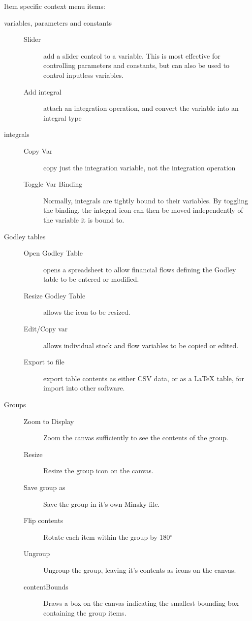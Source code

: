 Item specific context menu items:
\begin{description}
\item[variables, parameters and constants]\mbox{}
\begin{description}
\item[Slider] add a slider control to a variable. This is most
effective for controlling parameters and constants, but can also be
used to control inputless variables.
\item[Add integral] attach an integration operation, and convert the
variable into an integral type
\end{description}
\item[integrals]\mbox{}
\begin{description}
\item[Copy Var] copy just the integration variable, not the
integration operation
\item[Toggle Var Binding] Normally, integrals are tightly bound to their
variables. By toggling the binding, the integral icon can then be
moved independently of the variable it is bound to. 
\end{description}
\item[Godley tables]\mbox{}
\begin{description}
\item[Open Godley Table] opens a spreadsheet to allow financial flows
defining the Godley table to be entered or modified.
\item[Resize Godley Table] allows the icon to be resized.
\item[Edit/Copy var] allows individual stock and flow variables to be
copied or edited.
\item[Export to file] export table contents as either CSV data, or as a LaTeX
table, for import into other software.
\end{description}

\item[Groups]\mbox{}
\begin{description}
\item[Zoom to Display] Zoom the canvas sufficiently to see the
contents of the group.
\item[Resize] Resize the group icon on the canvas.
\item[Save group as] Save the group in it's own Minsky file.
\item[Flip contents] Rotate each item within the group by 180$^\circ$
\item[Ungroup] Ungroup the group, leaving it's contents as icons on
the canvas.
\item[contentBounds] Draws a box on the canvas indicating the smallest
bounding box containing the group items.
\end{description}



\end{description}
